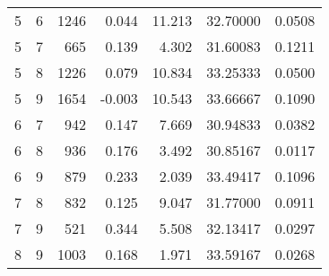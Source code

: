 \begin{longtable}{rrrrrrr}
5 & 6 & 1246 & 0.044 & 11.213 & 32.70000 & 0.0508 \\ 
5 & 7 & 665 & 0.139 & 4.302 & 31.60083 & 0.1211 \\ 
5 & 8 & 1226 & 0.079 & 10.834 & 33.25333 & 0.0500 \\ 
5 & 9 & 1654 & -0.003 & 10.543 & 33.66667 & 0.1090 \\ 
6 & 7 & 942 & 0.147 & 7.669 & 30.94833 & 0.0382 \\ 
6 & 8 & 936 & 0.176 & 3.492 & 30.85167 & 0.0117 \\ 
6 & 9 & 879 & 0.233 & 2.039 & 33.49417 & 0.1096 \\ 
7 & 8 & 832 & 0.125 & 9.047 & 31.77000 & 0.0911 \\ 
7 & 9 & 521 & 0.344 & 5.508 & 32.13417 & 0.0297 \\ 
8 & 9 & 1003 & 0.168 & 1.971 & 33.59167 & 0.0268 \\ 
\bottomrule
\end{longtable}

